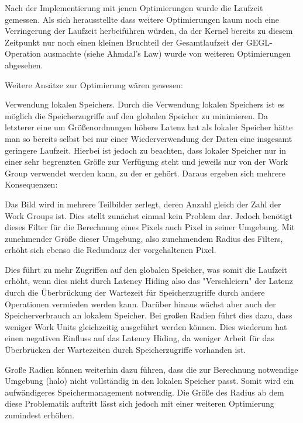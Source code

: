\documentclass[10pt,a4paper]{article}
\begin{document}
Nach der Implementierung mit jenen Optimierungen wurde die Laufzeit gemessen. Als sich herausstellte dass weitere Optimierungen kaum noch eine Verringerung der Laufzeit herbeiführen würden, da der Kernel bereits zu diesem Zeitpunkt nur noch einen kleinen Bruchteil der Gesamtlaufzeit der GEGL-Operation ausmachte (siehe Ahmdal's Law) wurde von weiteren Optimierungen abgesehen.

Weitere Ansätze zur Optimierung wären gewesen:

Verwendung lokalen Speichers. Durch die Verwendung lokalen Speichers ist es möglich die Speicherzugriffe auf den globalen Speicher zu minimieren. Da letzterer eine um Größenordnungen höhere Latenz hat als lokaler Speicher hätte man so bereits selbst bei nur einer Wiederverwendung der Daten eine insgesamt geringere Laufzeit. Hierbei ist jedoch zu beachten, dass lokaler Speicher nur in einer sehr begrenzten Größe zur Verfügung steht und jeweils nur von der Work Group verwendet werden kann, zu der er gehört. Daraus ergeben sich mehrere Konsequenzen:

Das Bild wird in mehrere Teilbilder zerlegt, deren Anzahl gleich der Zahl der Work Groups ist. Dies stellt zunächst einmal kein Problem dar. Jedoch benötigt dieses Filter für die Berechnung eines Pixels auch Pixel in seiner Umgebung. Mit zunehmender Größe dieser Umgebung, also zunehmendem Radius des Filters, erhöht sich ebenso die Redundanz der vorgehaltenen Pixel.


Dies führt zu mehr Zugriffen auf den globalen Speicher, was somit die Laufzeit erhöht, wenn dies nicht durch Latency Hiding also das "Verschleiern" der Latenz durch die Überbrückung der Wartezeit für Speicherzugriffe durch andere Operationen vermieden werden kann.
Darüber hinaus wächst aber auch der Speicherverbrauch an lokalem Speicher. Bei großen Radien führt dies dazu, dass weniger Work Units gleichzeitig ausgeführt werden können. Dies wiederum hat einen negativen Einfluss auf das Latency Hiding, da weniger Arbeit für das Überbrücken der Wartezeiten durch Speicherzugriffe vorhanden ist. 



Große Radien können weiterhin dazu führen, dass die zur Berechnung notwendige Umgebung (halo) nicht vollständig in den lokalen Speicher passt. Somit wird ein aufwändigeres Speichermanagement notwendig. Die Größe des Radius ab dem diese Problematik auftritt lässt sich jedoch mit einer weiteren Optimierung zumindest erhöhen.
\end{document}
